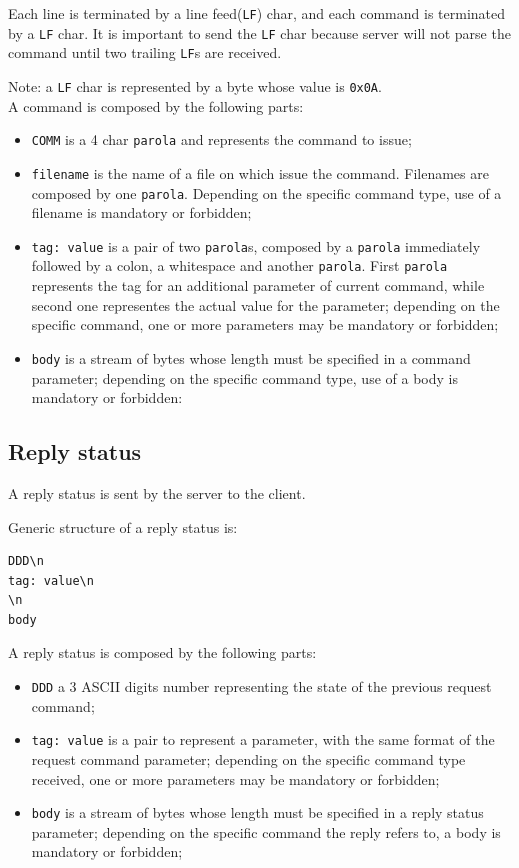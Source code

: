 \documentclass[a4paper,12pt]{article}
\begin{document}
Each line is terminated by a line feed(\texttt{LF}) char, and each command is terminated by a \texttt{LF} char.
It is important to send the \texttt{LF} char because server will not parse the command until two trailing \texttt{LF}s are received.

Note: a \texttt{LF} char is represented by a byte whose value is \texttt{0x0A}.
\\
A command is composed by the following parts:
\begin{itemize}
  \item \texttt{COMM} is a 4 char \texttt{parola} and represents the command to issue;
  \item \texttt{filename} is the name of a file on which issue the command.
  Filenames are composed by one \texttt{parola}.
  Depending on the specific command type, use of a filename is mandatory or forbidden;
  \item \texttt{tag: value} is a pair of two \texttt{parola}s, composed by a \texttt{parola} immediately followed by a colon, a whitespace and another \texttt{parola}.
  First \texttt{parola} represents the tag for an additional parameter of current command, while second one representes the actual value for the parameter; depending on the specific command, one or more parameters may be mandatory or forbidden;
  \item \texttt{body} is a stream of bytes whose length must be specified in a command parameter; depending on the specific command type, use of a body is mandatory or forbidden:
\end{itemize}

\subsection{Reply status}
A reply status is sent by the server to the client.

Generic structure of a reply status is:

\begin{verbatim}
DDD\n
tag: value\n
\n
body
\end{verbatim}

A reply status is composed by the following parts:
\begin{itemize}
  \item \texttt{DDD} a 3 ASCII digits number representing the state of the previous request command;
  \item \texttt{tag: value} is a pair to represent a parameter, with the same format of the request command parameter; depending on the specific command type received, one or more parameters may be mandatory or forbidden;
  \item \texttt{body} is a stream of bytes whose length must be specified in a reply status parameter; depending on the specific command the reply refers to, a body is mandatory or forbidden;
\end{itemize}
\end{document}
